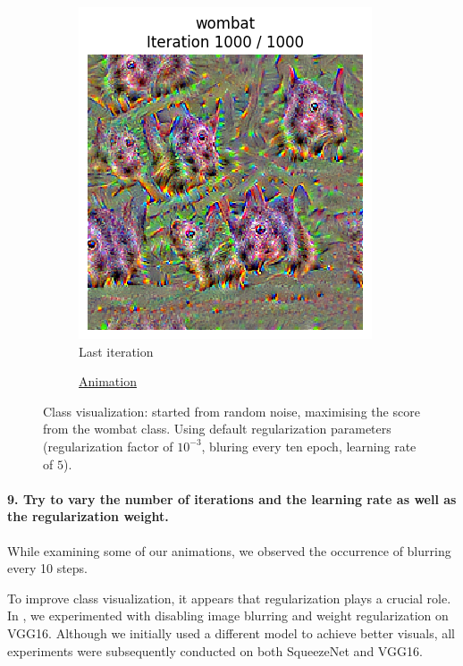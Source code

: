 \begin{figure}[H]
    \centering
    \begin{subfigure}{.5\textwidth}
        \centering
        \includegraphics[width=.7\linewidth]{SqueezeNet/SqueezeNet_wombat_animated_1000_last_frame.png}
        \caption{Last iteration}
        \label{fig:class_viz_wombat:png}
    \end{subfigure}%
    \begin{subfigure}{.5\textwidth}
        \centering
        \caption{\href{figs/2b/SqueezeNet/SqueezeNet_wombat_animated_1000.mp4}{Animation}}
        \label{fig:class_viz_wombat:vid}
    \end{subfigure}

    \caption{Class visualization: started from random noise, maximising the score from the wombat class. Using default regularization parameters (regularization factor of $10^{-3}$, bluring every ten epoch, learning rate of $5$).}
    \label{fig:class_viz_wombat}
\end{figure}

\paragraph*{9. Try to vary the number of iterations and the learning rate as well as the regularization weight.}
While examining some of our animations, we observed the occurrence of blurring every 10 steps.

To improve class visualization, it appears that regularization plays a crucial role. In , we experimented with disabling image blurring and weight regularization on VGG16. Although we initially used a different model to achieve better visuals, all experiments were subsequently conducted on both SqueezeNet and VGG16.


